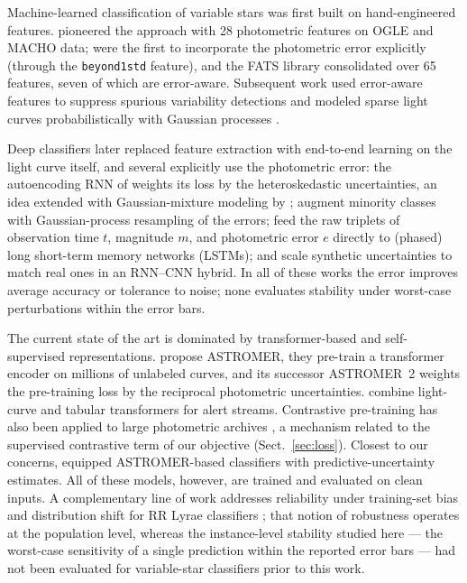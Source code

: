 \documentclass{aa}
\begin{document}
Machine-learned classification of variable stars was first built on
hand-engineered features. \citet{debosscher2007automated} pioneered the
approach with 28 photometric features on OGLE and MACHO data;
\citet{richards2011machine} were the first to incorporate the photometric
error explicitly (through the \texttt{beyond1std} feature), and the FATS
library \citep{nun2015fats} consolidated over 65 features, seven of which
are error-aware. Subsequent work used error-aware features to suppress
spurious variability detections \citep{sokolovsky2017comparative,
pashchenko2018machine} and modeled sparse light curves probabilistically
with Gaussian processes \citep{castro2018uncertain}.

Deep classifiers later replaced feature extraction with end-to-end
learning on the light curve itself, and several explicitly use the
photometric error: the autoencoding RNN of \citet{naul2018recurrent}
weights its loss by the heteroskedastic uncertainties, an idea extended
with Gaussian-mixture modeling by \citet{tsang2019deep};
\citet{hosenie2020imbalance} augment minority classes with Gaussian-process
resampling of the errors; \citet{donoso2021effect} feed the raw triplets of observation time $t$, magnitude $m$, and photometric error $e$
directly to (phased) long short-term memory networks (LSTMs); and \citet{kang2023periodic} scale synthetic
uncertainties to match real ones in an RNN--CNN hybrid. In all of these
works the error improves average accuracy or tolerance to noise; none
evaluates stability under worst-case perturbations within the error bars.

The current state of the art is dominated by transformer-based and
self-supervised representations. \citet{donoso2023astromer} propose ASTROMER, they pre-train a transformer encoder on millions of unlabeled curves, and its successor ASTROMER~2 \citep{donoso2026astromer2} weights the pre-training loss by the reciprocal photometric uncertainties. \citet{cabrera2024atat} combine light-curve and tabular transformers for
alert streams. Contrastive pre-training has also been applied to large
photometric archives \citep{ding2026starclr}, a mechanism related to the
supervised contrastive term of our objective (Sect.~\ref{sec:loss}).
Closest to our concerns, \citet{cadiz2024uncertainty} equipped
ASTROMER-based classifiers with predictive-uncertainty estimates. All of
these models, however, are trained and evaluated on clean inputs. A
complementary line of work addresses reliability under training-set bias
and distribution shift for RR Lyrae classifiers
\citep{perez2021informative, perez2023informative, perez2025self};
that notion of robustness operates at the population level, whereas the
instance-level stability studied here --- the worst-case sensitivity of a
single prediction within the reported error bars --- had not been
evaluated for variable-star classifiers prior to this work.
\end{document}
